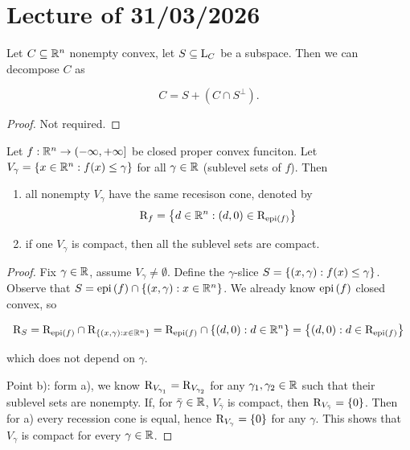 \chapter{Lecture \thechapter{} of 31/03/2026}

\begin{proposition}
    
    Let $C \subseteq {\mathbb{R}^n}$ nonempty convex, let $S \subseteq \mathrm{L}_{C}$ be a subspace. Then we can decompose $C$ as 

    \[ C = S + (C \cap S^\perp). \]

\end{proposition}

\begin{proof}
    Not required.
\end{proof}

\begin{proposition}[Book 1.4.5]
    
    Let $f : {\mathbb{R}^n} \to (-\infty,+\infty]$ be closed proper convex funciton. Let $V_\gamma = \left\{ x \in {\mathbb{R}^n} : f(x) \le \gamma \right\}$ for all $\gamma \in \mathbb{R}$ (sublevel sets of $f$). Then

    \begin{enumerate}
        \item[a)] all nonempty $V_\gamma$ have the same recesison cone, denoted by 
            \[ \mathrm{R}_{f} = \left\{ d \in {\mathbb{R}^n} : (d,0) \in \mathrm{R}_{\mathrm{epi}\left(f\right)} \right\} \]
        \item[b)] if one $V_\gamma$ is compact, then all the sublevel sets are compact.
    \end{enumerate}

\end{proposition}

\begin{proof}
    
    Fix $\gamma \in \mathbb{R}$, assume $V_\gamma \neq \emptyset$. Define the $\gamma$-slice $S = \left\{ (x,\gamma) : f(x) \le \gamma \right\}$. Observe that $S = \mathrm{epi}\left(f\right) \cap \left\{ (x,\gamma) : x \in {\mathbb{R}^n} \right\}$. We already know $\mathrm{epi}\left(f\right)$ closed convex, so 
    
    \[ \mathrm{R}_{S} = \mathrm{R}_{\mathrm{epi}\left(f\right)} \cap \mathrm{R}_{\left\{ (x,\gamma) : x \in {\mathbb{R}^n} \right\}} = \mathrm{R}_{\mathrm{epi}\left(f\right)} \cap \left\{ (d,0) : d \in {\mathbb{R}^n} \right\} = \left\{ (d,0) : d \in \mathrm{R}_{\mathrm{epi}\left(f\right)} \right\} \] 
    
    which does not depend on $\gamma$.

    Point b): form a), we know $\mathrm{R}_{V_{\gamma_1}} = \mathrm{R}_{V_{\gamma_2}}$ for any $\gamma_1,\gamma_2 \in \mathbb{R}$ such that their sublevel sets are nonempty. If, for $\bar{\gamma} \in \mathbb{R}$, $V_{\bar{\gamma}}$ is compact, then $\mathrm{R}_{V_{\bar{\gamma}}} = \left\{ 0 \right\}$. Then for a) every recession cone is equal, hence $\mathrm{R}_{V_\gamma} = \left\{ 0 \right\}$ for any $\gamma$. This shows that $V_\gamma$ is compact for every $\gamma \in \mathbb{R}$.

\end{proof}


